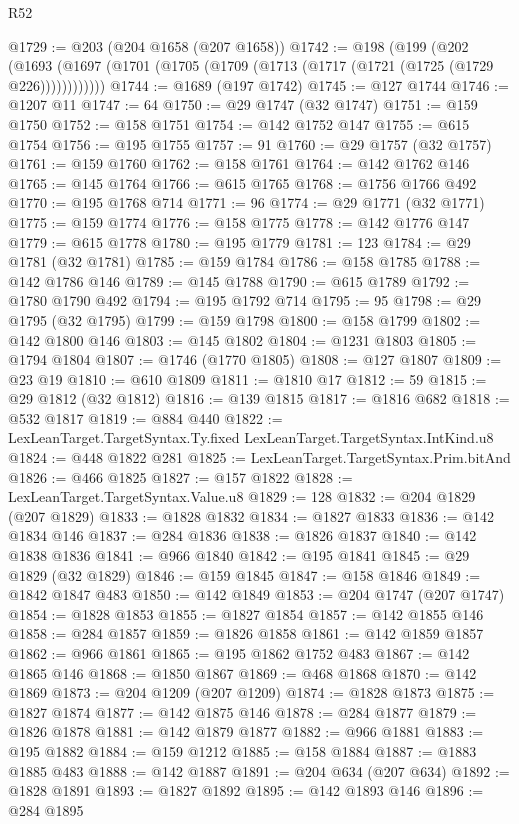 \begin{lexlean}{R52}
\begin{coremodule}
@1729 := @203 (@204 @1658 (@207 @1658))
@1742 := @198
    (@199
      (@202 (@1693 (@1697 (@1701 (@1705 (@1709 (@1713 (@1717 (@1721 (@1725 (@1729 @226))))))))))))
@1744 := @1689 (@197 @1742)
@1745 := @127 @1744
@1746 := @1207 @11
@1747 := 64
@1750 := @29 @1747 (@32 @1747)
@1751 := @159 @1750
@1752 := @158 @1751
@1754 := @142 @1752 @147
@1755 := @615 @1754
@1756 := @195 @1755
@1757 := 91
@1760 := @29 @1757 (@32 @1757)
@1761 := @159 @1760
@1762 := @158 @1761
@1764 := @142 @1762 @146
@1765 := @145 @1764
@1766 := @615 @1765
@1768 := @1756 @1766 @492
@1770 := @195 @1768 @714
@1771 := 96
@1774 := @29 @1771 (@32 @1771)
@1775 := @159 @1774
@1776 := @158 @1775
@1778 := @142 @1776 @147
@1779 := @615 @1778
@1780 := @195 @1779
@1781 := 123
@1784 := @29 @1781 (@32 @1781)
@1785 := @159 @1784
@1786 := @158 @1785
@1788 := @142 @1786 @146
@1789 := @145 @1788
@1790 := @615 @1789
@1792 := @1780 @1790 @492
@1794 := @195 @1792 @714
@1795 := 95
@1798 := @29 @1795 (@32 @1795)
@1799 := @159 @1798
@1800 := @158 @1799
@1802 := @142 @1800 @146
@1803 := @145 @1802
@1804 := @1231 @1803
@1805 := @1794 @1804
@1807 := @1746 (@1770 @1805)
@1808 := @127 @1807
@1809 := @23 @19
@1810 := @610 @1809
@1811 := @1810 @17
@1812 := 59
@1815 := @29 @1812 (@32 @1812)
@1816 := @139 @1815
@1817 := @1816 @682
@1818 := @532 @1817
@1819 := @884 @440
@1822 := LexLeanTarget.TargetSyntax.Ty.fixed LexLeanTarget.TargetSyntax.IntKind.u8
@1824 := @448 @1822 @281
@1825 := LexLeanTarget.TargetSyntax.Prim.bitAnd
@1826 := @466 @1825
@1827 := @157 @1822
@1828 := LexLeanTarget.TargetSyntax.Value.u8
@1829 := 128
@1832 := @204 @1829 (@207 @1829)
@1833 := @1828 @1832
@1834 := @1827 @1833
@1836 := @142 @1834 @146
@1837 := @284 @1836
@1838 := @1826 @1837
@1840 := @142 @1838 @1836
@1841 := @966 @1840
@1842 := @195 @1841
@1845 := @29 @1829 (@32 @1829)
@1846 := @159 @1845
@1847 := @158 @1846
@1849 := @1842 @1847 @483
@1850 := @142 @1849
@1853 := @204 @1747 (@207 @1747)
@1854 := @1828 @1853
@1855 := @1827 @1854
@1857 := @142 @1855 @146
@1858 := @284 @1857
@1859 := @1826 @1858
@1861 := @142 @1859 @1857
@1862 := @966 @1861
@1865 := @195 @1862 @1752 @483
@1867 := @142 @1865 @146
@1868 := @1850 @1867
@1869 := @468 @1868
@1870 := @142 @1869
@1873 := @204 @1209 (@207 @1209)
@1874 := @1828 @1873
@1875 := @1827 @1874
@1877 := @142 @1875 @146
@1878 := @284 @1877
@1879 := @1826 @1878
@1881 := @142 @1879 @1877
@1882 := @966 @1881
@1883 := @195 @1882
@1884 := @159 @1212
@1885 := @158 @1884
@1887 := @1883 @1885 @483
@1888 := @142 @1887
@1891 := @204 @634 (@207 @634)
@1892 := @1828 @1891
@1893 := @1827 @1892
@1895 := @142 @1893 @146
@1896 := @284 @1895

\end{coremodule}
\end{lexlean}
